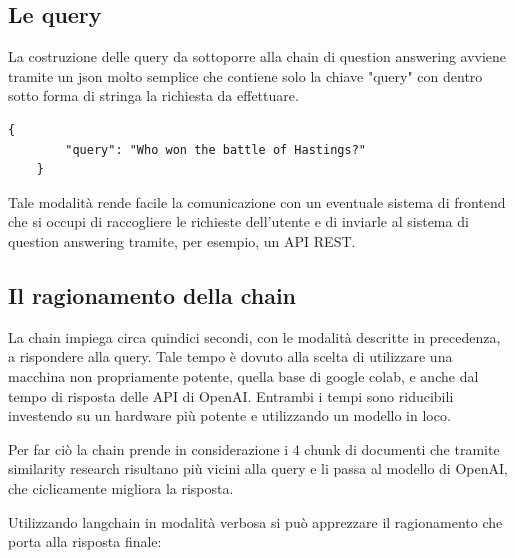 \subsection{Le query}
La costruzione delle query da sottoporre alla chain di question answering avviene tramite un json molto semplice che contiene solo la chiave "query" con dentro sotto forma di stringa la richiesta da effettuare.
\begin{lstlisting}[firstnumber=1]
    {
        "query": "Who won the battle of Hastings?"
    }
\end{lstlisting}

Tale modalità rende facile la comunicazione con un eventuale sistema di frontend che si occupi di raccogliere le richieste dell'utente e di inviarle al sistema di question answering tramite, per esempio, un API REST.

\subsection{Il ragionamento della chain}

La chain impiega circa quindici secondi, con le modalità descritte in precedenza, a rispondere alla query.
Tale tempo è dovuto alla scelta di utilizzare una macchina non propriamente potente, quella base di google colab, e anche dal tempo di risposta delle API di OpenAI.
Entrambi i tempi sono riducibili investendo su un hardware più potente e utilizzando un modello in loco.

Per far ciò la chain prende in considerazione i 4 chunk di documenti che tramite similarity research risultano più vicini alla query e li passa al modello di OpenAI, che ciclicamente migliora la risposta.

Utilizzando langchain in modalità verbosa si può apprezzare il ragionamento che porta alla risposta finale:

